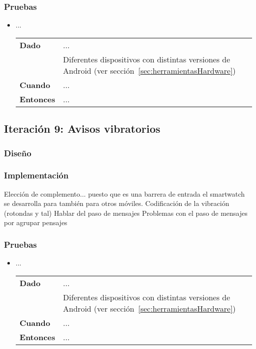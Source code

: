\subsubsection{Pruebas}
\begin{itemize}
  \item ...

  \begin{tabular}{p{}p{}}
    \hline
    \textbf{Dado}     & ... \\
                      & Diferentes dispositivos con distintas versiones de Android (ver
                        sección~\ref{sec:herramientasHardware}) \\
    \textbf{Cuando}   & ... \\
    \textbf{Entonces} & ... \\
    \hline
  \end{tabular}
\end{itemize}

\subsection{Iteración 9: Avisos vibratorios}
\subsubsection{Diseño}
\subsubsection{Implementación}
Elección de complemento... puesto que es una barrera de entrada el smartwatch se desarrolla para
también para otros móviles.
Codificación de la vibración (rotondas y tal)
Hablar del paso de mensajes
Problemas con el paso de mensajes por agrupar pensajes
\begin{listing}[
  float=ht,
  language = java,
  caption  = {},
  label    = code:]

\end{listing}
\subsubsection{Pruebas}
\begin{itemize}
  \item ...

  \begin{tabular}{p{}p{}}
    \hline
    \textbf{Dado}     & ... \\
                      & Diferentes dispositivos con distintas versiones de Android (ver
                        sección~\ref{sec:herramientasHardware}) \\
    \textbf{Cuando}   & ... \\
    \textbf{Entonces} & ... \\
    \hline
  \end{tabular}
\end{itemize}

